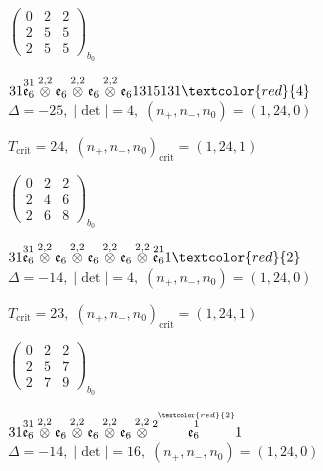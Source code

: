 \documentclass[10pt]{article}
\begin{document}
\hspace{2em}$\left(\begin{smallmatrix}0 & 2 & 2 \\ 2 & 5 & 5 \\ 2 & 5 & 5\end{smallmatrix}\right)_{\!b_0}$

\smallskip

$31\overset{31}{\mathfrak{e}_6}\overset{2,2}{\otimes}\mathfrak{e}_6\overset{2,2}{\otimes}\mathfrak{e}_6\overset{2,2}{\otimes}\mathfrak{e}_61315131\textcolor{red}{4}$ \quad $\Delta=-25,\; |\det|=4,\; (n_+,n_-,n_0)=(1,24,0)$

\hspace{1em}$T_{\text{crit}}=24,\; (n_+,n_-,n_0)_{\text{crit}}=(1,24,1)$

\hspace{2em}$\left(\begin{smallmatrix}0 & 2 & 2 \\ 2 & 4 & 6 \\ 2 & 6 & 8\end{smallmatrix}\right)_{\!b_0}$

\smallskip

$31\overset{31}{\mathfrak{e}_6}\overset{2,2}{\otimes}\mathfrak{e}_6\overset{2,2}{\otimes}\mathfrak{e}_6\overset{2,2}{\otimes}\mathfrak{e}_6\overset{2,2}{\otimes}\overset{21}{\mathfrak{e}_6}1\textcolor{red}{2}$ \quad $\Delta=-14,\; |\det|=4,\; (n_+,n_-,n_0)=(1,24,0)$

\hspace{1em}$T_{\text{crit}}=23,\; (n_+,n_-,n_0)_{\text{crit}}=(1,24,1)$

\hspace{2em}$\left(\begin{smallmatrix}0 & 2 & 2 \\ 2 & 5 & 7 \\ 2 & 7 & 9\end{smallmatrix}\right)_{\!b_0}$

$31\overset{31}{\mathfrak{e}_6}\overset{2,2}{\otimes}\mathfrak{e}_6\overset{2,2}{\otimes}\mathfrak{e}_6\overset{2,2}{\otimes}\mathfrak{e}_6\overset{2,2}{\otimes}\overset{2\overset{\textcolor{red}{2}}{1}}{\mathfrak{e}_6}1$ \quad $\Delta=-14,\; |\det|=16,\; (n_+,n_-,n_0)=(1,24,0)$
\end{document}
